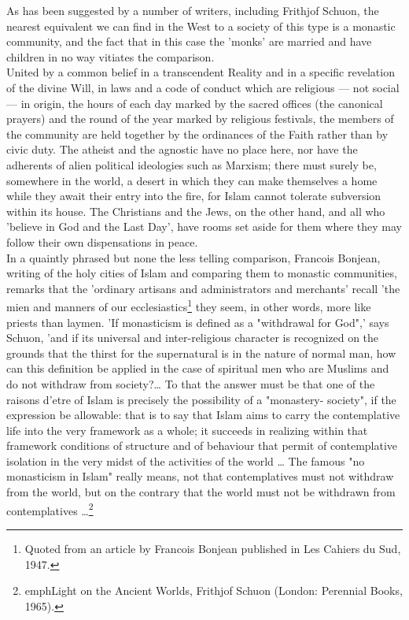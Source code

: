 \documentclass[11pt, b5paper, twoside]{book}
\begin{document}
As has been suggested by a number of writers, including Frithjof Schuon, the nearest equivalent we 
can find in the West to a society of this type is a monastic community, and the fact that in this 
case the 'monks' are married and have children in no way vitiates the comparison. \\

United by a common belief in a transcendent Reality and in a specific revelation of the divine Will, 
in laws and a code of conduct which are religious --- not social --- in origin, the hours of each day 
marked by the sacred offices (the canonical prayers) and the round of the year marked by religious 
festivals, the members of the community are held together by the ordinances of the Faith rather than 
by civic duty. The atheist and the agnostic have no place here, nor have the adherents of alien 
political ideologies such as Marxism; there must surely be, somewhere in the world, a desert in which 
they can make themselves a home while they await their entry into the fire, for Islam cannot tolerate 
subversion within its house. The Christians and the Jews, on the other hand, and all who 'believe in 
God and the Last Day', have rooms set aside for them where they may follow their own dispensations in 
peace. \\

In a quaintly phrased but none the less telling comparison, Francois Bonjean, writing of the holy 
cities of Islam and comparing them to monastic communities, remarks that the 'ordinary artisans and 
administrators and merchants' recall 'the mien and manners of our ecclesiastics\footnote{Quoted from an article by Francois Bonjean published in Les Cahiers du Sud, 1947.} they seem, in 
other words, more like priests than laymen. 'If monasticism is defined as a "withdrawal for God",' 
says Schuon, 'and if its universal and inter-religious character is recognized on the grounds that 
the thirst for the supernatural is in the nature of normal man, how can this definition be applied in 
the case of spiritual men who are Muslims and do not withdraw from society?\ldots{} To that the answer 
must be that one of the raisons d'etre of Islam is precisely the possibility of a "monastery-
society", if the expression be allowable: that is to say that Islam aims to carry the contemplative 
life into the very framework as a whole; it succeeds in realizing within that framework conditions of 
structure and of behaviour that permit of contemplative isolation in the very midst of the activities 
of the world \ldots{} The famous "no monasticism in Islam" really means, not that contemplatives must not 
withdraw from the world, but on the contrary that the world must not be withdrawn from contemplatives 
\ldots{}\footnote{emph{Light on the Ancient Worlds}, Frithjof Schuon (London: Perennial Books, 1965).}
\end{document}
